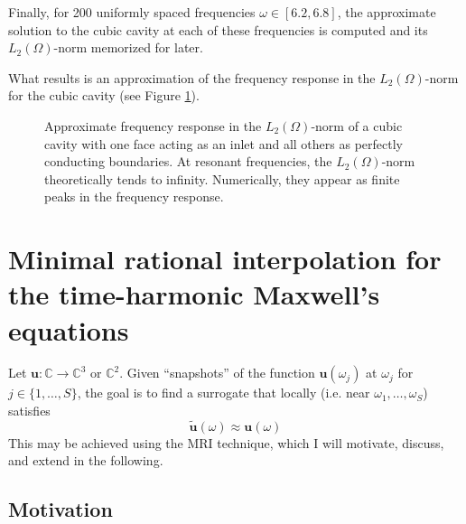 \documentclass[11pt, a4paper]{article}
\begin{document}
Finally, for 200 uniformly spaced frequencies $\omega \in [6.2, 6.8]$, the 
approximate solution to the cubic cavity at each of these frequencies is
computed and its $L_2(\Omega)$-norm memorized for later.


What results is an approximation of the frequency response in the $L_2(\Omega)$-norm
for the cubic cavity (see Figure \ref{fig:fenics-demonstration}). 
\begin{figure}[h]
    \centering
    
    \caption{Approximate frequency response in the $L_2(\Omega)$-norm of a cubic cavity with
    one face acting as an inlet and all others as perfectly conducting boundaries.
    At resonant frequencies, the $L_2(\Omega)$-norm theoretically tends to infinity.
    Numerically, they appear as finite peaks in the frequency response.}
    \label{fig:fenics-demonstration}
\end{figure}

\newpage
\section{Minimal rational interpolation for the time-harmonic Maxwell's equations}
\label{sec:mri}

Let $\mathbf{u} : \mathbb{C} \to \mathbb{C}^3$ or $\mathbb{C}^2$. Given \enquote{snapshots} of the
function $\mathbf{u}(\omega_j)$ at $\omega_j$ for $j \in \{1, \dots, S\}$, the
goal is to find a surrogate that locally (i.e. near $\omega_1, \dots, \omega_S$)
satisfies
\begin{equation}
    \mathbf{\tilde{u}}(\omega) \approx \mathbf{u}(\omega)
\end{equation}
This may be achieved using the \acrfull{MRI} technique, which I will motivate,
discuss, and extend in the following.

\subsection{Motivation}
\label{subsec:motivation}
\end{document}
